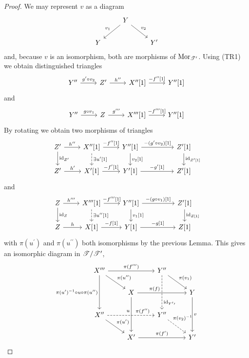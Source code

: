 \documentclass[dissertation.tex]{subfiles}
\begin{document}
\begin{lem}
  \begin{proof}
    We may represent $v$ as a diagram
    $$\begin{tikzcd}
      & Y \arrow[swap]{ld}{v_1}\arrow{rd}{v_2}\\
      Y & & Y^\prime
    \end{tikzcd}$$
    and, because $v$ is an isomorphism, both are morphisms of $\operatorname{Mor}_{\mathscr{T}^\prime}$.
    Using (TR1) we obtain distinguished triangles
    $$\begin{tikzcd}
      Y^{\prime\prime} \arrow{r}{g^\prime \circ v_2} & Z^\prime \arrow{r}{h^{\prime\prime}} & X^{\prime\prime}[1] \arrow{r}{-f^{\prime\prime}[1]} & Y^{\prime\prime}[1]
    \end{tikzcd}$$
    and
    $$\begin{tikzcd}
      Y^{\prime\prime} \arrow{r}{g \circ v_1} & Z \arrow{r}{g^{\prime\prime\prime}} & X^{\prime\prime\prime}[1] \arrow{r}{-f^{\prime\prime\prime}[1]} & Y^{\prime\prime}[1]
    \end{tikzcd}$$
    By rotating we obtain two morphisms of triangles
    $$\begin{tikzcd}
      Z^\prime \arrow{r}{h^{\prime\prime}}\arrow{d}{\id_{Z^\prime}} & X^{\prime\prime}[1] \arrow{r}{-f^{\prime\prime}[1]}\arrow[dashed]{d}{\exists u^\prime[1]} & Y^{\prime\prime}[1] \arrow{rr}{-(g^\prime \circ v_2)[1]}\arrow{d}{v_2[1]} & & Z^\prime[1]\arrow{d}{\id_{Z^\prime[1]}}\\
      Z^\prime \arrow{r}{h^\prime} & X^\prime[1] \arrow{r}{-f^\prime[1]} & Y^\prime[1] \arrow{rr}{-g^\prime[1]} & & Z^\prime[1]
    \end{tikzcd}$$
    and
    $$\begin{tikzcd}
      Z \arrow{r}{h^{\prime\prime\prime}}\arrow{d}{\id_Z} & X^{\prime\prime\prime}[1] \arrow{r}{-f^{\prime\prime\prime}[1]}\arrow[dashed]{d}{\exists u^{\prime\prime}[1]} & Y^{\prime\prime}[1] \arrow{rr}{-(g \circ v_1)[1]}\arrow{d}{v_1[1]} & & Z^\prime[1]\arrow{d}{\id_{Z[1]}}\\
      Z \arrow{r}{h} & X[1] \arrow{r}{-f[1]} & Y[1] \arrow{rr}{-g[1]} & & Z[1]
    \end{tikzcd}$$
    with $\pi(u^\prime)$ and $\pi(u^{\prime\prime})$ both isomorphisms by the previous Lemma.
    This gives an isomorphic diagram in $\mathscr{T}/\mathscr{T}^\prime$,
    $$\begin{tikzcd}
      X^{\prime\prime\prime} \arrow[swap]{dd}{\pi(u^\prime)^{-1} \circ u \circ \pi(u^{\prime\prime})}\arrow{rr}{\pi(f^{\prime\prime\prime})}\arrow{rd}{\pi(u^{\prime\prime})} & & Y^{\prime\prime}\arrow[dashed,pos=0.8]{dd}{\id_{Y^\prime\prime}}\arrow{rd}{\pi(v_1)}\\
      & X\arrow[pos=0.35]{rr}{\pi(f)}\arrow[swap,pos=0.4]{dd}{u} & & Y\arrow{dd}{v}\\
      X^{\prime\prime}\arrow[dashed,pos=0.75]{rr}{\pi(f^{\prime\prime})}\arrow{rd}{\pi(u^\prime)} & & Y^{\prime\prime}\arrow[dashed,pos=0.2]{rd}{\pi(v_2)^{-1}}\\
      & X^\prime \arrow{rr}{\pi(f^\prime)} & & Y^\prime
    \end{tikzcd}$$


\end{proof}
\end{lem}
\end{document}
